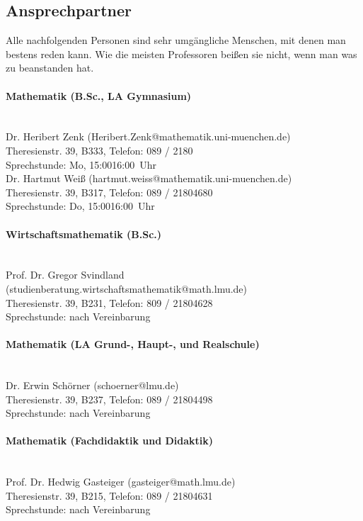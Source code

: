 \subsection{Ansprechpartner}

Alle nachfolgenden Personen sind sehr umgängliche Menschen, mit denen
man bestens reden kann. Wie die meisten Professoren beißen sie nicht,
wenn man was zu beanstanden hat.

\paragraph{Mathematik (B.Sc., LA Gymnasium)}\hfill\\
Dr. Heribert Zenk (Heribert.Zenk@mathematik.uni-muenchen.de)\\
Theresienstr. 39, B333, Telefon: 089 / 2180\\
Sprechstunde: Mo, 15:00\emd{}16:00~Uhr\\

Dr. Hartmut Weiß (hartmut.weiss@mathematik.uni-muenchen.de)\\
Theresienstr. 39, B317, Telefon: 089 / 2180\emd{}4680\\
Sprechstunde: Do, 15:00\emd{}16:00~Uhr

\paragraph{Wirtschaftsmathematik (B.Sc.)}\hfill\\
Prof. Dr. Gregor Svindland (studienberatung.wirtschaftsmathematik@math.lmu.de)\\
Theresienstr. 39, B231, Telefon: 809 / 2180\emd{}4628\\
Sprechstunde: nach Vereinbarung

\paragraph{Mathematik (LA Grund-, Haupt-, und Realschule)}\hfill\\
Dr. Erwin Schörner (schoerner@lmu.de)\\
Theresienstr. 39, B237, Telefon: 089 / 2180\emd{}4498\\
Sprechstunde: nach Vereinbarung

\paragraph{Mathematik (Fachdidaktik und Didaktik)}\hfill\\
Prof. Dr. Hedwig Gasteiger (gasteiger@math.lmu.de)\\
Theresienstr. 39, B215, Telefon: 089 / 2180\emd{}4631\\
Sprechstunde: nach Vereinbarung

